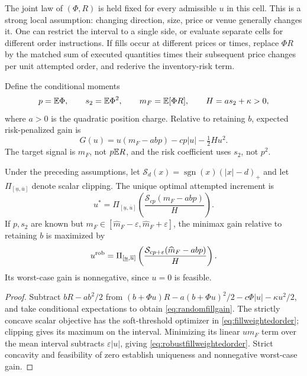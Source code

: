 The joint law of \((\Phi,R)\) is held fixed for every admissible \(u\) in
this cell. This is a strong local assumption: changing direction, size,
price or venue generally changes it. One can restrict the interval to a
single side, or evaluate separate cells for different order instructions.
If fills occur at different prices or times, replace \(\Phi R\) by the
matched sum of executed quantities times their subsequent price changes
per unit attempted order, and rederive the inventory-risk term.

Define the conditional moments
\[
 p=\mathbb E\Phi,\qquad s_2=\mathbb E\Phi^2,\qquad m_F=\mathbb E[\Phi R],
 \qquad H=a s_2+\kappa>0,
\]
where \(a>0\) is the quadratic position charge. Relative to retaining
\(b\), expected risk-penalized gain is
\begin{equation}\label{eq:randomfillgain}
 G(u)=u(m_F-abp)-cp|u|-\tfrac12 H u^2.
\end{equation}
The target signal is \(m_F\), not \(p\mathbb E R\), and the risk coefficient
uses \(s_2\), not \(p^2\).

\begin{proposition}
\label{prop:fillweightedorder}
Under the preceding assumptions, let \(\mathcal S_d(x)=
\operatorname{sgn}(x)(|x|-d)_+\) and let
\(\Pi_{[\underline u,\overline u]}\) denote scalar clipping. The unique
optimal attempted increment is
\begin{equation}\label{eq:fillweightedorder}
 u^*=\Pi_{[\underline u,\overline u]}
       \left(\frac{\mathcal S_{cp}(m_F-abp)}{H}\right).
\end{equation}
If \(p,s_2\) are known but \(m_F\in[\widehat m_F-\varepsilon,
\widehat m_F+\varepsilon]\), the minimax gain relative to retaining
\(b\) is maximized by
\begin{equation}\label{eq:robustfillweightedorder}
 u^{\rm rob}=\Pi_{[\underline u,\overline u]}
       \left(\frac{\mathcal S_{cp+\varepsilon}(\widehat m_F-abp)}{H}\right).
\end{equation}
Its worst-case gain is nonnegative, since \(u=0\) is feasible.
\end{proposition}
\begin{proof}
Subtract \(bR-ab^2/2\) from
\((b+\Phi u)R-a(b+\Phi u)^2/2-c\Phi|u|-\kappa u^2/2\), and take
conditional expectations to obtain \eqref{eq:randomfillgain}. The
strictly concave scalar objective has the soft-threshold optimizer
in \eqref{eq:fillweightedorder}; clipping gives its maximum on the
interval. Minimizing its linear \(u m_F\) term over the mean interval
subtracts \(\varepsilon|u|\), giving
\eqref{eq:robustfillweightedorder}. Strict concavity and feasibility of
zero establish uniqueness and nonnegative worst-case gain.
\end{proof}

